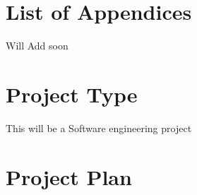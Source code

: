 \documentclass[]{article}
\begin{document}
\section{List of Appendices}
Will Add soon

\section{Project Type}
This will be a Software engineering project
\section{Project Plan}
\noindent
{}
{}
\end{document}
